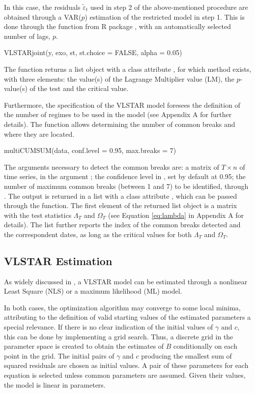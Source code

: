 In this case, the residuals $\tilde{\varepsilon}_t$ used in step 2 of the above-mentioned procedure are obtained through a VAR($p$) estimation of the restricted model in step 1. This is done through the  function from R package , with an automatically selected number of lags, $p$. 
%
\begin{example}
	VLSTARjoint(y, exo, st, st.choice = FALSE, alpha = 0.05)
\end{example}
%
The function  returns a list object with a class attribute , for which  method exists, with three elements: the value(s) of the Lagrange Multiplier value (LM), the $p$-value(s) of the test and the critical value. 

Furthermore, the specification of the VLSTAR model foresees the definition of the number of regimes to be used in the model (see Appendix A for further details). The function  allows determining the number of common breaks and where they are located. 
%
\begin{example}
	multiCUMSUM(data, conf.level = 0.95, max.breaks = 7)
\end{example}
%
The arguments necessary to detect the common breaks are: a matrix of $T \times n$ of time series, in the argument ; the confidence level in , set by default at 0.95; the number of maximum common breaks (between 1 and 7) to be identified, through . The output is returned in a list with a class attribute , which can be passed through the  function. The first element of the returned list object is a matrix with the test statistics $\Lambda_T$ and $\Omega_T$ (see Equation \eqref{eq:lambda} in Appendix A for details). The list further reports the index of the common breaks detected and the correspondent dates, as long as the critical values for both $\Lambda_T$ and $\Omega_T$.

\subsection{VLSTAR Estimation}

As widely discussed in \citet*{teraya14}, a VLSTAR model can be estimated through a nonlinear Least Square (NLS) or a maximum likelihood (ML) model. 

In both cases, the optimization algorithm may converge to some local minima, attributing to the definition of valid starting values of the estimated parameters a special relevance. If there is no clear indication of the initial values of $\gamma$ and $c$, this can be done by implementing a grid search. Thus, a discrete grid in the parameter space is created to obtain the estimates of $B$ conditionally on each point in the grid. The initial pairs of $\gamma$ and $c$ producing the smallest sum of squared residuals are chosen as initial values. A pair of these parameters for each equation is selected unless common parameters are assumed. Given their values, the model is linear in parameters.

